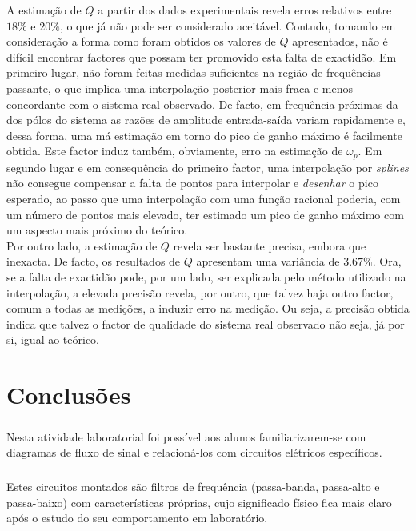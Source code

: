 \documentclass[a4paper,11pt]{report}
\begin{document}
A estimação de $Q$ a partir dos dados experimentais revela erros relativos entre $18\%$ e $20\%$, o que já não pode ser considerado aceitável. Contudo, tomando em consideração a forma como foram obtidos os valores de $Q$ apresentados, não é difícil encontrar factores que possam ter promovido esta falta de exactidão. Em primeiro lugar, não foram feitas medidas suficientes na região de frequências passante, o que implica uma interpolação posterior mais fraca e menos concordante com o sistema real observado. De facto, em frequência próximas da dos pólos do sistema as razões de amplitude entrada-saída variam rapidamente e, dessa forma, uma má estimação em torno do pico de ganho máximo é facilmente obtida. Este factor induz também, obviamente, erro na estimação de $\omega_p$. Em segundo lugar e em consequência do primeiro factor, uma interpolação por \textit{splines} não consegue compensar a falta de pontos para interpolar e \emph{desenhar} o pico esperado, ao passo que uma interpolação com uma função racional poderia, com um número de pontos mais elevado, ter estimado um pico de ganho máximo com um aspecto mais próximo do teórico.\\
Por outro lado, a estimação de $Q$ revela ser bastante precisa, embora que inexacta. De facto, os resultados de $Q$ apresentam uma variância de $3.67\%$. Ora, se a falta de exactidão pode, por um lado, ser explicada pelo método utilizado na interpolação, a elevada precisão revela, por outro, que talvez haja outro factor, comum a todas as medições, a induzir erro na medição. Ou seja, a precisão obtida indica que talvez o factor de qualidade do sistema real observado não seja, já por si, igual ao teórico.

\chapter{Conclusões}

\paragraph{}
Nesta atividade laboratorial foi possível aos alunos familiarizarem-se com diagramas de fluxo de sinal e relacioná-los com circuitos elétricos específicos.

\paragraph{}
Estes circuitos montados são filtros de frequência (passa-banda, passa-alto e passa-baixo) com características próprias, cujo significado físico fica mais claro após o estudo do seu comportamento em laboratório.
\end{document}
